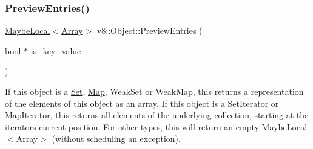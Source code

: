 \subsubsection{\texorpdfstring{Preview\+Entries()}{PreviewEntries()}}
{\footnotesize\ttfamily \mbox{\hyperlink{classv8_1_1MaybeLocal}{Maybe\+Local}}$<$\mbox{\hyperlink{classv8_1_1Array}{Array}}$>$ v8\+::\+Object\+::\+Preview\+Entries (\begin{DoxyParamCaption}\item[{bool $\ast$}]{is\+\_\+key\+\_\+value }\end{DoxyParamCaption})}

If this object is a \mbox{\hyperlink{classv8_1_1Set}{Set}}, \mbox{\hyperlink{classv8_1_1Map}{Map}}, Weak\+Set or Weak\+Map, this returns a representation of the elements of this object as an array. If this object is a Set\+Iterator or Map\+Iterator, this returns all elements of the underlying collection, starting at the iterator\textquotesingle{}s current position. For other types, this will return an empty Maybe\+Local$<$\+Array$>$ (without scheduling an exception). \mbox{\label{classv8_1_1Object_a8b3bc74f5b4f5b5fc87560d0548274ed}} 
